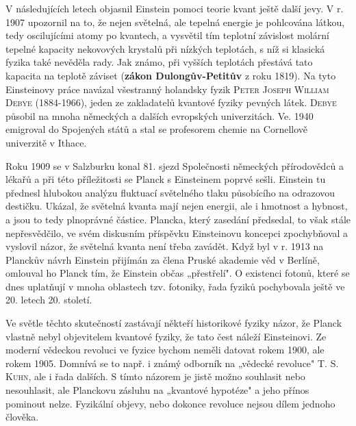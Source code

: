         V následujících letech objasnil Einstein pomoci teorie kvant ještě další jevy. V r. 1907
        upozornil na to, že nejen světelná, ale tepelná energie je pohlcována látkou, tedy
        oscilujícími atomy po kvantech, a vysvětil tím teplotní závislost molární tepelné kapacity
        nekovových krystalů při nízkých teplotách, s níž si klasická fyzika také nevěděla rady. Jak
        známo, při vyšších teplotách přestává tato kapacita na teplotě záviset (\textbf{zákon
        Dulongův-Petitův} z roku 1819). Na tyto Einsteinovy práce navázal všestranný holandsky fyzik
        \textsc{Peter Joseph William Debye} (1884-1966), jeden ze zakladatelů kvantové fyziky
        pevných látek. \textsc{Debye} působil na mnoha německých a dalších evropských univerzitách.
        Ve. 1940 emigroval do Spojených států a stal se profesorem chemie na Cornellově univerzitě v
        Ithace.

        Roku 1909 se v Salzburku konal 81. sjezd Společnosti německých přírodovědců a lékařů a při
        této příležitosti se Planck s Einsteinem poprvé sešli. Einstein tu přednesl hlubokou analýzu
        fluktuací světelného tlaku působícího na odrazovou destičku. Ukázal, že světelná kvanta mají
        nejen energii, ale i hmotnost a hybnost, a jsou to tedy plnoprávné částice. Plancka, který
        zasedání předsedal, to však stále nepřesvědčilo, ve svém diskusním příspěvku Einsteinovu
        koncepci zpochybňoval a vyslovil názor, že světelná kvanta není třeba zavádět. Když byl v r.
        1913 na Planckův návrh Einstein přijímán za člena Pruské akademie věd v Berlíně, omlouval ho
        Planck tím, že Einstein občas „přestřelí". O existenci fotonů, které se dnes uplatňují v
        mnoha oblastech tzv. fotoniky, řada fyziků pochybovala ještě ve 20. letech 20. století. 

        Ve světle těchto skutečností zastávají někteří historikové fyziky názor, že Planck vlastně
        nebyl objevitelem kvantové fyziky, že tato čest náleží Einsteinovi. Ze moderní vědeckou
        revoluci ve fyzice bychom neměli datovat rokem 1900, ale rokem 1905. Domnívá se to např. i
        známý odborník na „vědecké revoluce" \textsc{T. S. Kuhn}, ale i řada dalších. S tímto
        názorem je jistě možno souhlasit nebo nesouhlasit, ale Planckovu zásluhu na „kvantové
        hypotéze" a jeho přínos pominout nelze. Fyzikální objevy, nebo dokonce revoluce nejsou dílem
        jednoho člověka.

